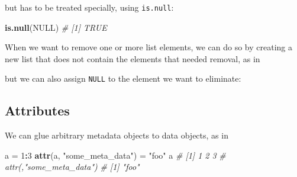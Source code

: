 \documentclass[]{book}
\newenvironment{Shaded}{\begin{snugshade}}{\end{snugshade}}
\newcommand{\CommentTok}[1]{\textcolor[rgb]{0.56,0.35,0.01}{\textit{#1}}}
\newcommand{\DecValTok}[1]{\textcolor[rgb]{0.00,0.00,0.81}{#1}}
\newcommand{\KeywordTok}[1]{\textcolor[rgb]{0.13,0.29,0.53}{\textbf{#1}}}
\newcommand{\NormalTok}[1]{#1}
\newcommand{\OperatorTok}[1]{\textcolor[rgb]{0.81,0.36,0.00}{\textbf{#1}}}
\newcommand{\OtherTok}[1]{\textcolor[rgb]{0.56,0.35,0.01}{#1}}
\newcommand{\StringTok}[1]{\textcolor[rgb]{0.31,0.60,0.02}{#1}}
\begin{document}
but has to be treated specially, using \texttt{is.null}:

\begin{Shaded}
\begin{Highlighting}[]
\KeywordTok{is.null}\NormalTok{(}\OtherTok{NULL}\NormalTok{)}
\CommentTok{# [1] TRUE}
\end{Highlighting}
\end{Shaded}

When we want to remove one or more list elements, we can do so by creating
a new list that does not contain the elements that needed removal, as in

\begin{Shaded}
\end{Shaded}

but we can also assign \texttt{NULL} to the element we want to eliminate:

\begin{Shaded}
\end{Shaded}

\hypertarget{attributes}{%
\subsection*{Attributes}\label{attributes}}

We can glue arbitrary metadata objects to data objects, as in

\begin{Shaded}
\begin{Highlighting}[]
\NormalTok{a =}\StringTok{ }\DecValTok{1}\OperatorTok{:}\DecValTok{3}
\KeywordTok{attr}\NormalTok{(a, }\StringTok{"some_meta_data"}\NormalTok{) =}\StringTok{ "foo"}
\NormalTok{a}
\CommentTok{# [1] 1 2 3}
\CommentTok{# attr(,"some_meta_data")}
\CommentTok{# [1] "foo"}
\end{Highlighting}
\end{Shaded}
\end{document}
